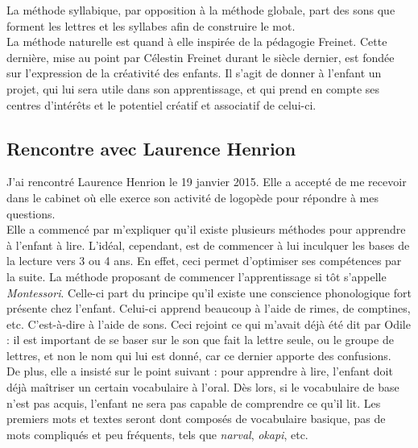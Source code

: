 La méthode syllabique, par opposition à la méthode globale, part des sons que forment les lettres et les syllabes afin de construire le mot.\\

La méthode naturelle est quand à elle inspirée de la pédagogie Freinet. Cette dernière, mise au point par Célestin Freinet durant le siècle dernier, est fondée sur l'expression de la créativité des enfants. Il s'agit de donner à l'enfant un projet, qui lui sera utile dans son apprentissage, et qui prend en compte ses centres d'intérêts et le potentiel créatif et associatif de celui-ci. 



\subsection{Rencontre avec Laurence Henrion}
J'ai rencontré Laurence Henrion le 19 janvier 2015. Elle a accepté de me recevoir dans le cabinet où elle exerce son activité de logopède pour répondre à mes questions.\\

Elle a commencé par m'expliquer qu'il existe plusieurs méthodes pour apprendre à l'enfant à lire. L'idéal, cependant, est de commencer à lui inculquer les bases de la lecture vers 3 ou 4 ans. En effet, ceci permet d'optimiser ses compétences par la suite. La méthode proposant de commencer l'apprentissage si tôt s'appelle \textit{Montessori}. Celle-ci part du principe qu'il existe une conscience phonologique fort présente chez l'enfant. Celui-ci apprend beaucoup à l'aide de rimes, de comptines, etc. C'est-à-dire à l'aide de sons. Ceci rejoint ce qui m'avait déjà été dit par Odile : il est important de se baser sur le son que fait la lettre seule, ou le groupe de lettres, et non le nom qui lui est donné, car ce dernier apporte des confusions.\\

De plus, elle a insisté sur le point suivant : pour apprendre à lire, l'enfant doit déjà maîtriser un certain vocabulaire à l'oral. Dès lors, si le vocabulaire de base n'est pas acquis, l'enfant ne sera pas capable de comprendre ce qu'il lit. Les premiers mots et textes seront dont composés de vocabulaire basique, pas de mots compliqués et peu fréquents, tels que \textit{narval}, \textit{okapi}, etc.